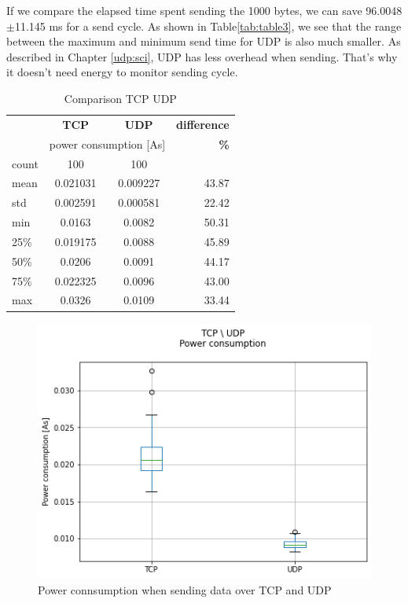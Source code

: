 \linebreak
If we compare the elapsed time spent sending the 1000 bytes,
we can save 96.0048$\pm$11.145 ms for a send cycle.
As shown in Table\ref{tab:table3},
we see that the range between the maximum and minimum send time for UDP is also much smaller.
As described in Chapter \ref{udp:sci}, UDP has less overhead when sending.
That's why it doesn't need energy to monitor sending cycle.
\begin{table}[htbp]
    \begin{center}
    \caption{Comparison TCP UDP}
    \label{tab:table4}
    \renewcommand{\arraystretch}{1.8}
    \begin{tabular}{l|c|c|r}
    & \textbf{TCP} & \textbf{{UDP}} & \textbf{difference} \\
    & \multicolumn{2}{c|}{ power consumption [As]} & \textbf{\%}\\
    \hline
    count & 100 & 100 & \\
    mean   & 0.021031 & 0.009227 & 43.87 \\
    std    & 0.002591 & 0.000581 & 22.42 \\
    min    & 0.0163 & 0.0082 & 50.31 \\
    25\%   & 0.019175 & 0.0088 & 45.89 \\
    50\%   & 0.0206 & 0.0091 & 44.17 \\
    75\%   & 0.022325 & 0.0096 & 43.00 \\
    max    & 0.0326 & 0.0109 & 33.44 \\
    \end{tabular}
    \end{center}
\end{table}
\linebreak
\begin{figure}[h]
    \centering
    \includegraphics[width = 1 \linewidth]{fig/udp_tcp/udp_tcp_boxplot_As.png}
    \caption{Power connsumption when sending data over TCP and UDP}
    \label{fig:udp_tcp_boxplot_As}
    \end{figure}
